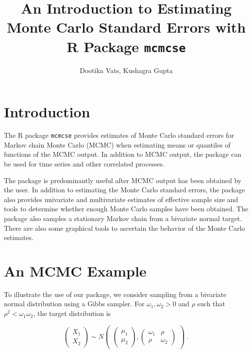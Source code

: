 \documentclass[11pt]{article}\usepackage[]{graphicx}\usepackage[]{color}
\title{An Introduction to Estimating Monte Carlo Standard Errors with R Package \texttt{mcmcse} }
\author{Dootika Vats, Kushagra Gupta}
\begin{document}
\maketitle
\setlength\parindent{0pt}
\tableofcontents

\break
\section{Introduction}
The R package \texttt{mcmcse} provides estimates of Monte Carlo standard errors for Markov chain Monte Carlo (MCMC) when estimating means or quantiles of functions of the MCMC output. In addition to MCMC output, the package can be used for time series and other correlated processes. 

The package is predominantly useful after MCMC output has been obtained by the user. In addition to estimating the Monte Carlo standard errors, the package also provides univariate and multivariate estimates of effective sample size and tools to determine whether enough Monte Carlo samples have been obtained. The package also samples a stationary Markov chain from a bivariate normal target. There are also some graphical tools to ascertain the behavior of the Monte Carlo estimates.



\bigskip
\section{An MCMC Example}

To illustrate the use of our package, we consider sampling from a bivariate normal distribution using a Gibbs sampler. For $\omega_1, \omega_2 > 0$ and  $\rho$ such that $\rho^2 < \omega_1 \omega_2$, the target distribution is 

\[
\left(\begin{array}{c}
  X_1 \\ X_2
\end{array} \right) \sim 
 N \begin{pmatrix}
\begin{pmatrix}
\mu_{1}\\
\mu_{2}
\end{pmatrix}, 
\begin{pmatrix}
\omega_1 & \rho \\
\rho & \omega_2
\end{pmatrix}
\end{pmatrix} \; .
\]
\end{document}
